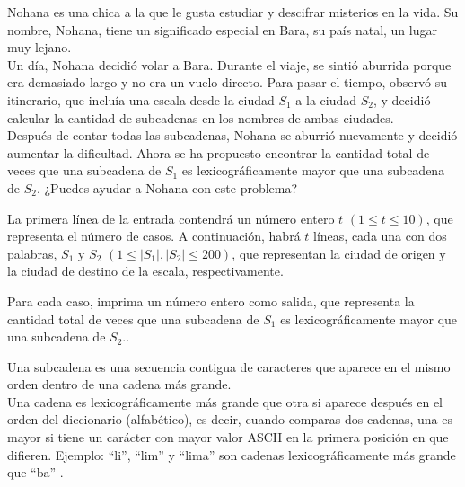 
Nohana es una chica a la que le gusta estudiar y descifrar misterios en la vida. Su nombre, Nohana, tiene un significado especial en Bara, su país natal, un lugar muy lejano.\\

Un día, Nohana decidió volar a Bara. Durante el viaje, se sintió aburrida porque era demasiado largo y no era un vuelo directo. Para pasar el tiempo, observó su itinerario, que incluía una escala desde la ciudad $S_1$ a la ciudad $S_2$, y decidió calcular la cantidad de subcadenas en los nombres de ambas ciudades.\\

Después de contar todas las subcadenas, Nohana se aburrió nuevamente y decidió aumentar la dificultad. Ahora se ha propuesto encontrar la cantidad total de veces que una subcadena de $S_1$ es lexicográficamente mayor que una subcadena de $S_2$. ¿Puedes ayudar a Nohana con este problema?


La primera línea de la entrada contendrá un número entero $t$ $(1 \le t \le 10)$, que representa el número de casos. A continuación, habrá $t$ líneas, cada una con dos palabras, $S_1$ y $S_2$  $(1 \le |S_1|,|S_2| \le 200)$, que representan la ciudad de origen y la ciudad de destino de la escala, respectivamente.

\outputText

Para cada caso, imprima un número entero como salida, que representa la cantidad total de veces que una subcadena de $S_1$ es lexicográficamente mayor que una subcadena de $S_2$..

\exampleCases

\begin{example}
\end{example}

\explanationText

Una subcadena es una secuencia contigua de caracteres que aparece en el mismo orden dentro de una cadena más grande.\\

Una cadena es lexicográficamente más grande que otra si aparece después en el orden del diccionario (alfabético), es decir, cuando comparas dos cadenas, una es mayor si tiene un carácter con mayor valor ASCII en la primera posición en que difieren. Ejemplo:  ``li'', ``lim'' y ``lima'' son  cadenas lexicográficamente más grande que  ``ba'' .